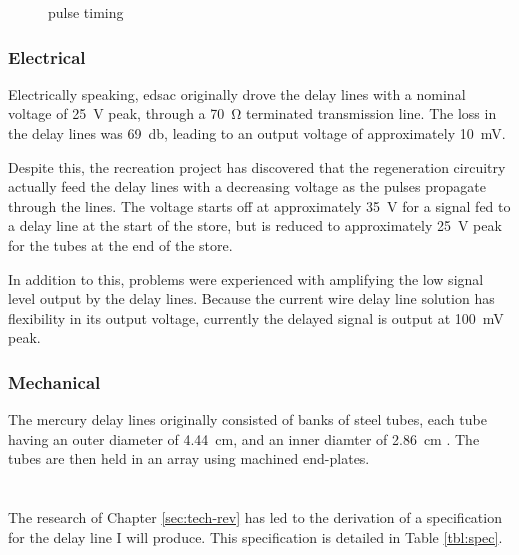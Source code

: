 \begin{figure}[ht]
	\centering
	\dummyfigure
	\caption{ pulse timing }
	\label{fig:edsac-pulse-timing}
\end{figure}

\subsection{Electrical}
Electrically speaking, \gls{edsac} originally drove the delay lines with a nominal voltage of \SI{25}{\volt} peak, through a \SI{70}{\ohm} terminated transmission line. The loss in the delay lines was \SI{69}{\decibel}, leading to an output voltage of approximately \SI{10}{\milli\volt}.

Despite this, the recreation project has discovered that the regeneration circuitry actually feed the delay lines with a decreasing voltage as the pulses propagate through the lines. The voltage starts off at approximately \SI{35}{\volt} for a signal fed to a delay line at the start of the store, but is reduced to approximately \SI{25}{\volt} peak for the tubes at the end of the store.

In addition to this, problems were experienced with amplifying the low signal level output by the delay lines. Because the current wire delay line solution has flexibility in its output voltage, currently the delayed signal is output at \SI{100}{\milli\volt} peak.

\subsection{Mechanical}
The mercury delay lines originally consisted of banks of steel tubes, each tube having an outer diameter of \SI{4.44}{\centi\metre}, and an inner diamter of \SI{2.86}{\centi\metre} \cite[p. 213]{wilkes1948}. The tubes are then held in an array using machined end-plates.



\chapter{}

The research of Chapter \ref{sec:tech-rev} has led to the derivation of a specification for the delay line I will produce. This specification is detailed in Table \ref{tbl:spec}.

